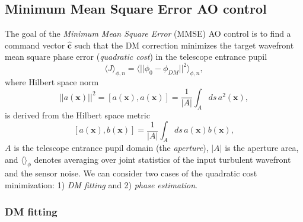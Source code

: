 \subsection{Minimum Mean Square Error AO control}
\label{subsec:MMSE-control}

The goal of the \emph{Minimum Mean Square Error} (MMSE)  AO control is to find a command vector $\hat{\bm{c}}$ such that
the DM correction minimizes the target wavefront mean square phase error
(\emph{quadratic cost})  in the
telescope entrance pupil
\begin{equation} \label{eq:mmse-cost}
	\langle J \rangle_{\phi,n} =
	\langle ||\phi_{0}-\phi_{DM}||^{2} \rangle_{\phi,n},
\end{equation}
where Hilbert space norm
\begin{equation} \label{eq:Hilbert-norm}
	|| a(\bm{x}) ||^{2} = [a(\bm{x}),a(\bm{x})] =
	\frac{1}{|A|} \int_{A} ds \, a^{2}(\bm{x}),
\end{equation}
is derived from the Hilbert space metric
\begin{equation} \label{eq:Hilbert-metric}
	[a(\bm{x}),b(\bm{x})] = \frac{1}{|A|} \int_{A} ds \, a(\bm{x}) b(\bm{x}),
\end{equation}
$A$ is the telescope entrance pupil domain (the \emph{aperture}),
 $|A|$ is the aperture area, and $\langle \rangle_{\phi}$
denotes averaging over joint statistics of the input turbulent wavefront and
the sensor noise. We can consider two cases of the quadratic cost
minimization: 1) \emph{DM fitting}  and 2) \emph{phase
estimation}. 

\subsubsection{DM fitting}

